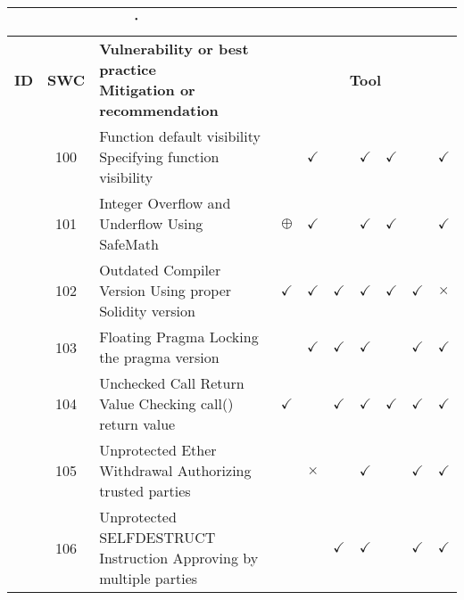 
\newcommand{\BP}{BP}
\newcommand{\falsepos}{$\oplus$}
\newcommand{\failed}{$\times$}
\newcommand{\noSWC}{$\bigcirc$} 
\newcommand{\notcovered}{}
\newcommand{\passed}{$\checkmark$}


\begin{table*}
\centering
\begin{adjustbox}{max height=10cm}
\begin{tabular}{|c|c|m{9cm}|c|c|c|c|c|c|c|}

\multicolumn{3}{c}{\.} &
\headrow{EY Review} &
\headrow{Smart Check} &
\headrow{Securify} &
\headrow{MythX (Mythril)} &
\headrow{Contract Guard} &
\headrow{Slither} &
\headrow{Odin} \\ \hline

\textbf{ID} & 
\textbf{SWC} & 
\textbf{Vulnerability or best practice \newline Mitigation or recommendation} &  
\multicolumn{7}{c|}{\textbf{Tool}} \\
\hline
			\hline\centering 1 & 100 & Function default visibility \newline Specifying function visibility & \notcovered & \passed & \notcovered & \passed & \passed & \notcovered & \passed \\
			\hline\centering 2 & 101 & Integer Overflow and Underflow \newline Using SafeMath & \falsepos & \passed & \notcovered & \passed & \passed & \notcovered & \passed \\
			\hline\centering 3 & 102 & Outdated Compiler Version \newline Using proper Solidity version & \passed & \passed & \passed & \passed & \passed & \passed & \failed \\
			\hline\centering 4 & 103 & Floating Pragma \newline Locking the pragma version & \notcovered & \passed & \passed & \passed & \notcovered & \passed & \passed \\
			\hline\centering 5 & 104 & Unchecked Call Return Value \newline Checking call() return value & \passed & \notcovered & \passed & \passed & \passed & \passed & \passed \\
			\hline\centering 6 & 105 & Unprotected Ether Withdrawal \newline Authorizing trusted parties & \notcovered & \failed & \notcovered & \passed & \notcovered & \passed & \passed \\
			\hline\centering 7 & 106 & Unprotected SELFDESTRUCT Instruction \newline Approving by multiple parties & \notcovered & \notcovered & \passed & \passed & \notcovered & \passed & \passed \\

\end{tabular}
\end{adjustbox}
\end{table*}
